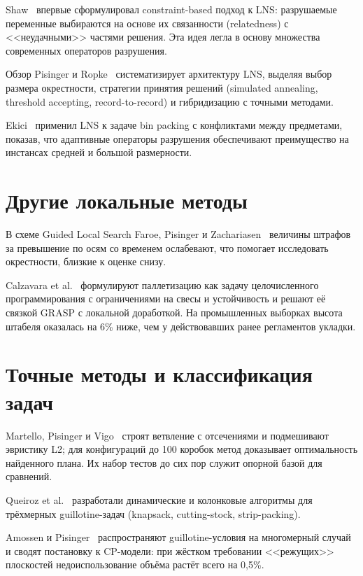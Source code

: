 Shaw~\cite{Shaw1998} впервые сформулировал constraint-based подход к LNS: разрушаемые переменные выбираются на основе их связанности (relatedness) с <<неудачными>> частями решения. Эта идея легла в основу множества современных операторов разрушения.

Обзор Pisinger и Ropke~\cite{Pisinger2010} систематизирует архитектуру LNS, выделяя выбор размера окрестности, стратегии принятия решений (simulated annealing, threshold accepting, record-to-record) и гибридизацию с точными методами.

Ekici~\cite{Ekici2023} применил LNS к задаче bin packing с конфликтами между предметами, показав, что адаптивные операторы разрушения обеспечивают преимущество на инстансах средней и большой размерности.

\section{Другие локальные методы}

В схеме Guided Local Search Faroe, Pisinger и Zachariasen~\cite{Faroe2003} величины штрафов за превышение по осям со временем ослабевают, что помогает исследовать окрестности, близкие к оценке снизу.

Calzavara et al.~\cite{Calzavara2021} формулируют паллетизацию как задачу целочисленного программирования с ограничениями на свесы и устойчивость и решают её связкой GRASP с локальной доработкой. На промышленных выборках высота штабеля оказалась на 6\% ниже, чем у действовавших ранее регламентов укладки.

\section{Точные методы и классификация задач}

Martello, Pisinger и Vigo~\cite{Martello2000} строят ветвление с отсечениями и подмешивают эвристику L2; для конфигураций до 100 коробок метод доказывает оптимальность найденного плана. Их набор тестов до сих пор служит опорной базой для сравнений.

Queiroz et al.~\cite{Queiroz2012} разработали динамические и колонковые алгоритмы для трёхмерных guillotine-задач (knapsack, cutting-stock, strip-packing).

Amossen и Pisinger~\cite{Amossen2010} распространяют guillotine-условия на многомерный случай и сводят постановку к CP-модели: при жёстком требовании <<режущих>> плоскостей недоиспользование объёма растёт всего на 0,5\%.

